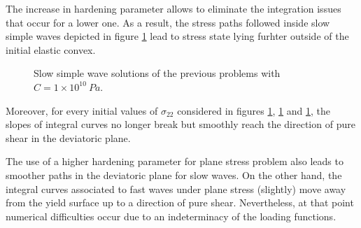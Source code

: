 The increase in hardening parameter allows to eliminate the integration issues that occur for a lower one.
As a result, the stress paths followed inside slow simple waves depicted in figure \ref{fig:slow_H} lead to stress state lying furhter outside of the initial elastic convex.
\begin{figure}[h!]
  \centering
  { \label{subfig:slow_H1}}
  { \label{subfig:slow_H2}}
  { \label{subfig:slow_H3}}
  \caption{Slow simple wave solutions of the previous problems with $C=1\times10^{10} \: Pa$.}
  \label{fig:slow_H}
\end{figure}
Moreover, for every initial values of $\sigma_{22}$ considered in figures \ref{fig:slow_H}, \ref{fig:slow_H} and \ref{fig:slow_H}, the slopes of integral curves no longer break but smoothly reach the direction of pure shear in the deviatoric plane.

\begin{remark}
  The use of a higher hardening parameter for plane stress problem also leads to smoother paths in the deviatoric plane for slow waves.
  On the other hand, the integral curves associated to fast waves under plane stress (slightly) move away from the yield surface up to a direction of pure shear.
  Nevertheless, at that point numerical difficulties occur due to an indeterminacy of the loading functions.
\end{remark}



